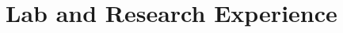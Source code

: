 \documentclass[letterpaper]{resume}
\begin{document}



\section{Lab and Research Experience}
\end{document}
